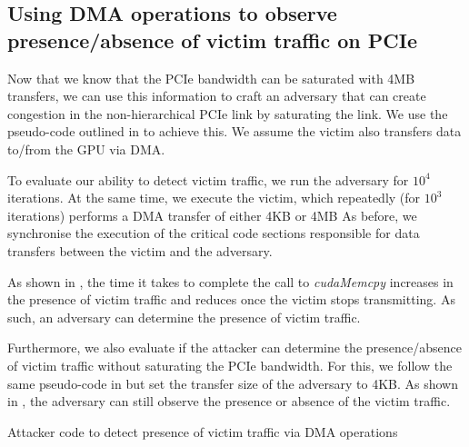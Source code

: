 \subsection{Using DMA operations to observe presence/absence of victim traffic on PCIe}
\label{subsec:interconnect-sc-dma-evaluation}

Now that we know that the PCIe bandwidth can be saturated with 4MB transfers, we can use this information to craft an adversary that can create congestion in the non-hierarchical PCIe link by saturating the link.
We use the pseudo-code outlined in  to achieve this.
We assume the victim also transfers data to/from the GPU via DMA.

To evaluate our ability to detect victim traffic, we run the adversary for $10^4$ iterations.
At the same time, we execute the victim, which repeatedly (for $10^3$ iterations) performs a DMA transfer of either 4KB or 4MB
As before, we synchronise the execution of the critical code sections responsible for data transfers between the victim and the adversary. 

As shown in , the time it takes to complete the call to \textit{cudaMemcpy} increases in the presence of victim traffic and reduces once the victim stops transmitting.
As such, an adversary can determine the presence of victim traffic.

Furthermore, we also evaluate if the attacker can determine the presence/absence of victim traffic without saturating the PCIe bandwidth.
For this, we follow the same pseudo-code in  but set the transfer size of the adversary to 4KB.
As shown in , the adversary can still observe the presence or absence of the victim traffic.


\begin{minipage}{\textwidth}
    
    \captionsetup{type=lstlisting}
    \caption{Attacker code to detect presence of victim traffic via DMA operations}
    \label{lst:timing-victim-with-dma}
\end{minipage}

